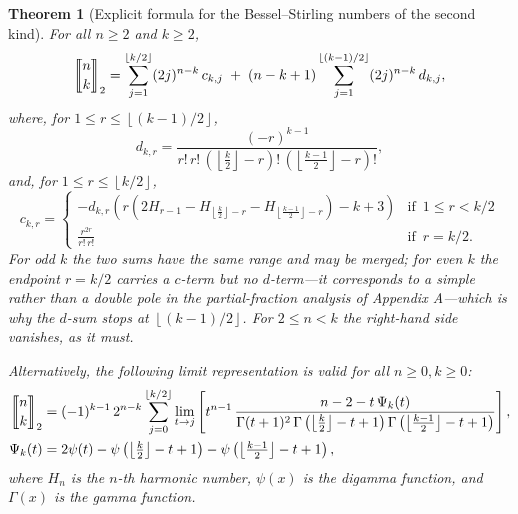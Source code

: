 \documentclass[a4paper]{amsart}
\numberwithin{equation}{section}
\newcommand{\mStirling}[0]{\genfrac{\llbracket}{\rrbracket}{0pt}{}}
\newcommand{\floor}[1]{\left\lfloor #1 \right\rfloor}
\newtheorem{theorem}{Theorem}[section]
\begin{document}
\begin{theorem}[Explicit formula for the Bessel--Stirling numbers of the second kind]\label{thm-bs-formula}
For all $n \geq 2$ and $k \geq 2$,
\[
    \mStirling{n}{k}_2 = \sum_{j=1}^{\floor{k/2}}(2j)^{n-k}\, c_{k,j} \;+\; (n-k+1)\sum_{j=1}^{\floor{(k-1)/2}}(2j)^{n-k}\, d_{k,j},
\]
where, for $1 \leq r \leq \floor{(k-1)/2}$,
\[
    d_{k,r} = \frac{(-r)^{k-1}}{r!\,r!\,(\floor{\frac{k}{2}}-r)!\,(\floor{\frac{k-1}{2}}-r)!},
\]
and, for $1 \leq r \leq \floor{k/2}$,
\[
    c_{k,r} = \begin{cases}
                - d_{k,r} \left(r(2H_{r-1}-H_{\floor{\frac{k}{2}}-r}-H_{\floor{\frac{k-1}{2}}-r})-k+3\right) & \text{if }\, 1 \leq r < k/2\\
                \frac{r^{2r}}{r!\,r!} & \text{if }\, r = k/2.
            \end{cases}
\]
For odd $k$ the two sums have the same range and may be merged; for even $k$ the endpoint $r = k/2$ carries a $c$-term but \emph{no} $d$-term---it corresponds to a simple rather than a double pole in the partial-fraction analysis of Appendix A---which is why the $d$-sum stops at $\floor{(k-1)/2}$. For $2 \leq n < k$ the right-hand side vanishes, as it must.

Alternatively, the following limit representation is valid for all $n\ge0, k\ge 0$:
\[
\begin{aligned}
    \mStirling{n}{k}_2 &= (-1)^{k-1}\, 2^{n-k} \sum_{j=0}^{\floor{k/2}} \lim_{t \to j} \left[t^{n-1}\,
        \frac
            {n-2-t\,\Psi_k(t)}
            {\Gamma(t+1)^{2}\, \Gamma\left(\floor{\tfrac{k}{2}}-t+1\right) \Gamma\left(\floor{\tfrac{k-1}{2}}-t+1\right)}\right],
        \\
        \Psi_k(t) &= 2\psi(t)-\psi\left(\floor{\tfrac{k}{2}}-t+1\right)-\psi\left(\floor{\tfrac{k-1}{2}}-t+1\right),
\end{aligned}
\]
where $H_n$ is the $n$-th harmonic number, $\psi(x)$ is the digamma function, and $\Gamma(x)$ is the gamma function.
\end{theorem}
\end{document}
